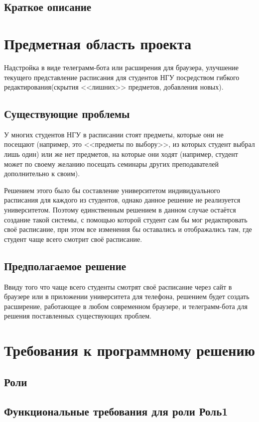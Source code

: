 \documentclass[a4paper]{report}
\begin{document}
		\section{Краткое описание}	
	\chapter{Предметная область проекта}
		Надстройка в виде телеграмм-бота или расширения для браузера, улучшение текущего представление расписания для студентов НГУ посредством гибкого редактирования(скрытия <<лишних>> предметов, добавления новых).
	
		\section{Существующие проблемы}
			У многих студентов НГУ в расписании стоят предметы, которые они не посещают (например, это <<предметы по выбору>>, из которых студент выбрал лишь один) или же нет предметов, на которые они ходят (например, студент может по своему желанию посещать семинары других преподавателей дополнительно к своим).
			
			Решением этого было бы составление университетом индивидуального расписания для каждого из студентов, однако данное решение не реализуется университетом. Поэтому единственным решением в данном случае остаётся создание такой системы, с помощью которой студент сам бы мог редактировать своё расписание, при этом все изменения бы оставались и отображались там, где студент чаще всего смотрит своё расписание. 
		\section{Предполагаемое решение}
			Ввиду того что чаще всего студенты смотрят своё расписание через сайт в браузере или в приложении университета для телефона, решением будет создать расширение, работающее в любом современном браузере, и телеграмм-бота для решения поставленных существующих проблем.
	\chapter{Требования к программному решению}
		\section{Роли}
		
		\section{Функциональные требования для роли Роль1}
\end{document}
